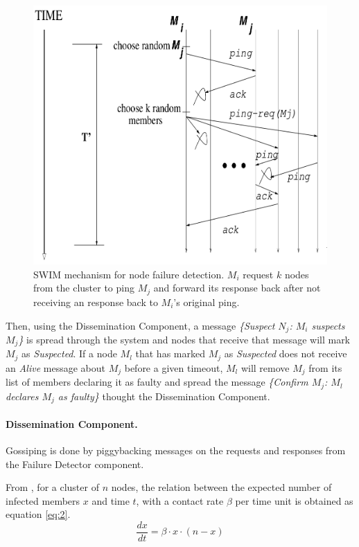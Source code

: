 \begin{figure}[h!]
		\centering
    	\includegraphics[scale=0.25]{assets/images/swim_net.png}
    	\caption{SWIM mechanism for node failure detection. $M_{i}$ request $k$ nodes from the cluster to ping $M_{j}$ and forward its response back after not receiving an response back to $M_{i}$'s original ping. \cite{SWIM}}
    	\label{image:web-milestone2}
\end{figure}

Then, using the Dissemination Component, a message \textit{\{Suspect $N_{j}$: $M_{i}$ suspects $M_{j}$\}} is spread through the system and nodes that receive that message will mark $M_{j}$ as \textit{Suspected}. If a node $M_{l}$ that has marked $M_{j}$ as \textit{Suspected} does not receive an \textit{Alive} message about $M_{j}$ before a given timeout, $M_{l}$ will remove $M_{j}$ from its list of members declaring it as faulty and spread the message \textit{\{Confirm $M_{j}$: $M_{l}$ declares $M_{j}$ as faulty\}} thought the Dissemination Component.\cite{SWIM}

\paragraph*{Dissemination Component.} Gossiping is done by piggybacking messages on the requests and responses from the Failure Detector component.

From \cite{epidemics}, for a cluster of $n$ nodes, the relation between the expected number of infected members $x$ and time $t$, with a contact rate $\beta$ per time unit is obtained as equation \ref{eq:2}.
\begin{equation}
\label{eq:2}
    \frac{dx}{dt} = \beta \cdot x \cdot (n - x)
\end{equation}

